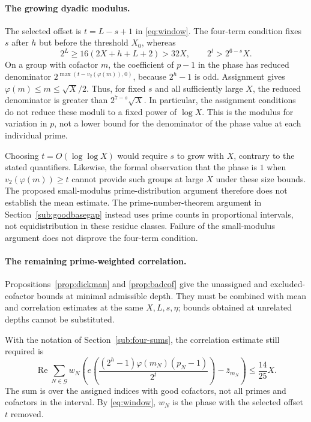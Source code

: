 \documentclass[11pt]{article}
\theoremstyle{plain}
\theoremstyle{definition}
\theoremstyle{remark}
\begin{document}
\paragraph{The growing dyadic modulus.}
The selected offset is $t=L-s+1$ in \eqref{eq:window}. The four-term
condition fixes $s$ after $h$ but before the threshold $X_0$, whereas
\[
 2^L\ge16(2X+h+L+2)>32X,\qquad 2^t>2^{6-s}X.
\]
On a group with cofactor $m$, the coefficient of $p-1$ in the phase
has reduced denominator $2^{\max(t-v_2(\varphi(m)),0)}$, because $2^h-1$
is odd. Assignment gives
$\varphi(m)\le m\le\sqrt X/2$. Thus, for fixed $s$ and all sufficiently
large $X$, the reduced denominator is greater than
$2^{7-s}\sqrt X$. In particular, the assignment conditions do not reduce
these moduli to a fixed power of $\log X$. This is the modulus for
variation in $p$, not a lower bound for the denominator of the phase
value at each individual prime.

Choosing $t=O(\log\log X)$ would require $s$ to grow with $X$, contrary
to the stated quantifiers. Likewise, the formal observation that the phase
is $1$ when $v_2(\varphi(m))\ge t$ cannot provide such groups at large $X$
under these size bounds. The proposed small-modulus prime-distribution
argument therefore does not establish the mean estimate. The
prime-number-theorem argument in Section~\ref{sub:goodbasegap} instead
uses prime counts in proportional intervals, not equidistribution in
these residue classes. Failure of the small-modulus argument does not
disprove the four-term condition.

\paragraph{The remaining prime-weighted correlation.}
Propositions~\ref{prop:dickman} and \ref{prop:badcof} give the unassigned
and excluded-cofactor bounds at minimal admissible depth. They must be
combined with mean and correlation estimates at the same $X,L,s,\eta$;
bounds obtained at unrelated depths cannot be substituted.

With the notation of Section~\ref{sub:four-sums}, the correlation estimate
still required is
\[
 \operatorname{Re}\sum_{N\in\mathcal G}w_N
 \left(e\!\left(\frac{(2^h-1)\varphi(m_N)(p_N-1)}{2^t}\right)
       -\bar z_{m_N}\right)\le\frac{14}{25}X.
\]
The sum is over the assigned indices with good cofactors, not all primes
and cofactors in the interval. By \eqref{eq:window}, $w_N$ is the phase
with the selected offset $t$ removed.
\end{document}

